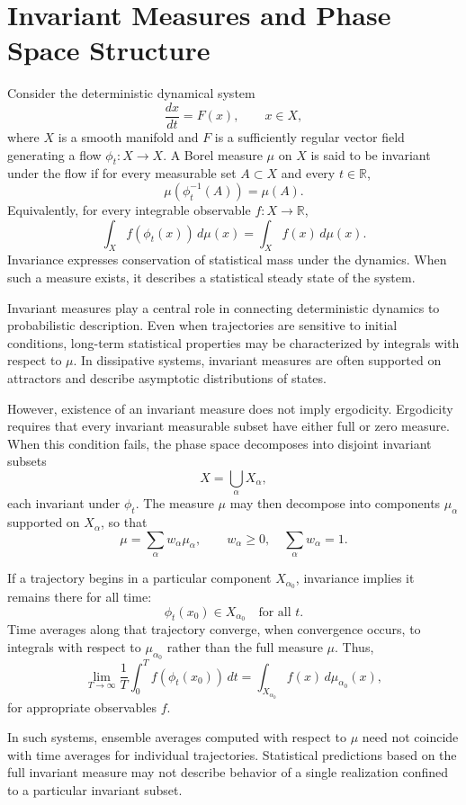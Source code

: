 \documentclass[12pt]{book}
\begin{document}
\section{Invariant Measures and Phase Space Structure}

Consider the deterministic dynamical system
\[
\frac{dx}{dt} = F(x),
\qquad x \in X,
\]
where $X$ is a smooth manifold and $F$ is a sufficiently regular vector field generating a flow $\phi_t : X \to X$. A Borel measure $\mu$ on $X$ is said to be invariant under the flow if for every measurable set $A \subset X$ and every $t \in \mathbb{R}$,
\[
\mu(\phi_t^{-1}(A)) = \mu(A).
\]
Equivalently, for every integrable observable $f : X \to \mathbb{R}$,
\[
\int_X f(\phi_t(x)) \, d\mu(x)
=
\int_X f(x) \, d\mu(x).
\]
Invariance expresses conservation of statistical mass under the dynamics. When such a measure exists, it describes a statistical steady state of the system.

Invariant measures play a central role in connecting deterministic dynamics to probabilistic description. Even when trajectories are sensitive to initial conditions, long-term statistical properties may be characterized by integrals with respect to $\mu$. In dissipative systems, invariant measures are often supported on attractors and describe asymptotic distributions of states.

However, existence of an invariant measure does not imply ergodicity. Ergodicity requires that every invariant measurable subset have either full or zero measure. When this condition fails, the phase space decomposes into disjoint invariant subsets
\[
X = \bigcup_{\alpha} X_\alpha,
\]
each invariant under $\phi_t$. The measure $\mu$ may then decompose into components $\mu_\alpha$ supported on $X_\alpha$, so that
\[
\mu = \sum_{\alpha} w_\alpha \mu_\alpha,
\qquad
w_\alpha \ge 0,
\quad
\sum_{\alpha} w_\alpha = 1.
\]

If a trajectory begins in a particular component $X_{\alpha_0}$, invariance implies it remains there for all time:
\[
\phi_t(x_0) \in X_{\alpha_0}
\quad \text{for all } t.
\]
Time averages along that trajectory converge, when convergence occurs, to integrals with respect to $\mu_{\alpha_0}$ rather than the full measure $\mu$. Thus,
\[
\lim_{T \to \infty}
\frac{1}{T}
\int_0^T
f(\phi_t(x_0)) \, dt
=
\int_{X_{\alpha_0}} f(x) \, d\mu_{\alpha_0}(x),
\]
for appropriate observables $f$.

In such systems, ensemble averages computed with respect to $\mu$ need not coincide with time averages for individual trajectories. Statistical predictions based on the full invariant measure may not describe behavior of a single realization confined to a particular invariant subset.
\end{document}
